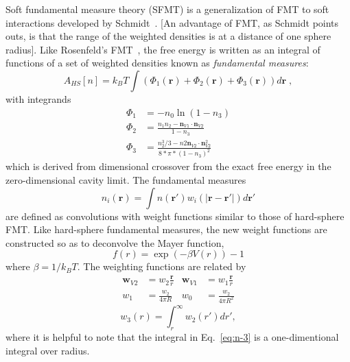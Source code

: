 \documentclass[letterpaper,twocolumn,amsmath,amssymb,prb]{revtex4-1}
\newcommand{\red}[1]{{\color{red} #1}}
\newcommand{\rr}{\textbf{r}}
\newcommand{\fixme}[1]{\red{[#1]}}
\begin{document}
Soft fundamental measure theory (SFMT) is a generalization of FMT to
soft interactions developed by
Schmidt~\cite{schmidt1999density}. \fixme{An advantage of FMT, as
  Schmidt points outs, is that the range of the weighted densities is
  at a distance of one sphere radius}.  Like Rosenfeld's
FMT~\cite{rosenfeld1989}, the free energy is written as an integral of
functions of a set of weighted densities known as \emph{fundamental
  measures}:
\begin{equation}
A_\textit{HS}[n] = k_B T \int \left(\Phi_1(\rr) + \Phi_2(\rr) +
\Phi_3(\rr)\right) d\rr \; ,
\end{equation}
with integrands
\begin{align}
\Phi_1 &= -n_0 \ln\left( 1 - n_3\right)\\
\Phi_2 &= \frac{n_1 n_2 - \mathbf{n}_{V1} \cdot\mathbf{n}_{V2}}{1-n_3} \\
\Phi_3 &= \frac{n_2^3/3 - n2\mathbf{n}_{V2}\cdot\mathbf{n}_{V2}^2}{8*\pi*(1-n_3)^2}
\end{align}
which is derived from dimensional crossover from the exact free energy
in the zero-dimensional cavity limit.  The fundamental measures
\begin{equation}
  n_{i}(\textbf{r}) = \int
  n(\textbf{r}')w_i(|\textbf{r}-\textbf{r}'|) d\textbf{r}'
  \label{eq:n-convolution}
\end{equation}
are defined as convolutions with weight functions similar to those of
hard-sphere FMT. Like hard-sphere fundamental measures, the new weight
functions are constructed so as to deconvolve the Mayer function,
\begin{equation}
  f(r) = \exp (-\beta V(r)) - 1
\end{equation}
where $\beta = 1/k_BT$.  The weighting functions are related by
\begin{align}
  \mathbf{w}_{V2} &= w_2\frac{\textbf{r}}{r} &
  \mathbf{w}_{V1} &= w_1\frac{\textbf{r}}{r}
  \label{eq:n-vectors}\\
  w_1 &= \frac{w_2}{4\pi R} &
  w_0 &= \frac{w_2}{4\pi R^2}
  \label{eq:n-0-1}
\end{align}
\begin{equation}
   w_3(r) = \int_{r}^{\infty} w_2(r') dr',
  \label{eq:n-3}
\end{equation}
where it is helpful to note that the integral in Eq.~\ref{eq:n-3} is
a one-dimentional integral over radius.
\end{document}
